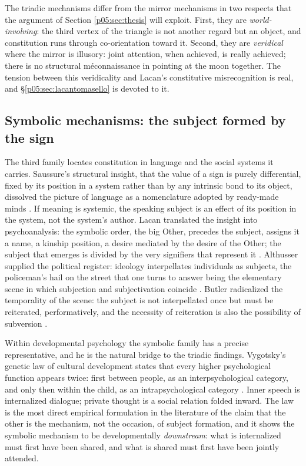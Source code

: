 \documentclass[11pt,a4paper]{article}
\theoremstyle{seriesthm}
\begin{document}
The triadic mechanisms differ from the mirror mechanisms in two respects that the argument of Section \ref{p05:sec:thesis} will exploit. First, they are \emph{world-involving}: the third vertex of the triangle is not another regard but an object, and constitution runs through co-orientation toward it. Second, they are \emph{veridical} where the mirror is illusory: joint attention, when achieved, is really achieved; there is no structural m\'econnaissance in pointing at the moon together. The tension between this veridicality and Lacan's constitutive misrecognition is real, and §\ref{p05:sec:lacantomasello} is devoted to it.

\subsection{Symbolic mechanisms: the subject formed by the sign}
\label{p05:sec:symbolic}

The third family locates constitution in language and the social systems it carries. Saussure's structural insight, that the value of a sign is purely differential, fixed by its position in a system rather than by any intrinsic bond to its object, dissolved the picture of language as a nomenclature adopted by ready-made minds \parencite{saussure1959}. If meaning is systemic, the speaking subject is an effect of its position in the system, not the system's author. Lacan translated the insight into psychoanalysis: the symbolic order, the big Other, precedes the subject, assigns it a name, a kinship position, a desire mediated by the desire of the Other; the subject that emerges is divided by the very signifiers that represent it \parencite{lacan2006}. Althusser supplied the political register: ideology interpellates individuals as subjects, the policeman's hail on the street that one turns to answer being the elementary scene in which subjection and subjectivation coincide \parencite{althusser1971}. Butler radicalized the temporality of the scene: the subject is not interpellated once but must be reiterated, performatively, and the necessity of reiteration is also the possibility of subversion \parencite{butler1997}.

Within developmental psychology the symbolic family has a precise representative, and he is the natural bridge to the triadic findings. Vygotsky's genetic law of cultural development states that every higher psychological function appears twice: first between people, as an interpsychological category, and only then within the child, as an intrapsychological category \parencite{vygotsky1978}. Inner speech is internalized dialogue; private thought is a social relation folded inward. The law is the most direct empirical formulation in the literature of the claim that the other is the mechanism, not the occasion, of subject formation, and it shows the symbolic mechanism to be developmentally \emph{downstream}: what is internalized must first have been shared, and what is shared must first have been jointly attended.
\end{document}
